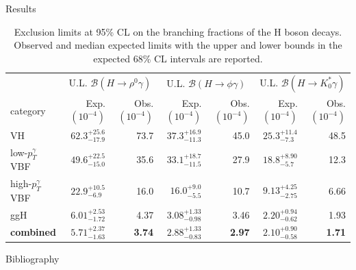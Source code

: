 \documentclass[9pt,aspectratio=1610]{beamer}
\begin{document}
\begin{frame}{Results}
	\begin{table}
		\centering
		\begin{tabular}{lrrrrrr}
			\hline
			& \multicolumn{2}{c}{U.L. $\mathcal{B}(H\rightarrow \rho^0\gamma)$}  & \multicolumn{2}{c}{U.L. $\mathcal{B}(H\rightarrow \phi\gamma)$} &  \multicolumn{2}{c}{U.L. $\mathcal{B}(H\rightarrow K^*_0\gamma)$}\\ [2ex]
			category & Exp.$(10^{-4})$ & Obs.$(10^{-4})$ & Exp.$(10^{-4})$ & Obs.$(10^{-4})$ & Exp.$(10^{-4})$ & Obs.$(10^{-4})$\\
			\hline
			VH & $62.3^{+25.6}_{-17.9}$ & 73.7 & $37.3^{+16.9}_{-11.3}$ & 45.0 & $25.3^{+11.4}_{-7.3}$ & 48.5 \\[2ex]
			low-$p_T^\gamma$ VBF & $49.6^{+22.5}_{-15.0}$ & 35.6 & $33.1^{+18.7}_{-11.5}$ & 27.9 & $18.8^{+8.90}_{-5.7}$  & 12.3\\[2ex]
			high-$p_T^\gamma$ VBF & $22.9^{+10.5}_{-6.9}$ & 16.0 & $16.0^{+9.0}_{-5.5}$ & 10.7 & $9.13^{+4.25}_{-2.75}$ & 6.66 \\[2ex]
			ggH &$6.01^{+2.53}_{-1.72}$ & 4.37 & $3.08^{+1.33}_{-0.98}$ & 3.46 & $2.20^{+0.94}_{-0.62}$ & 1.93\\ [2ex]
			\cellcolor{orange!50}\textbf{combined} & \cellcolor{orange!50}$5.71^{+2.37}_{-1.63}$ & \cellcolor{orange!50}\textbf{3.74} & \cellcolor{orange!50} $2.88^{+1.33}_{-0.83}$ & \cellcolor{orange!50} \textbf{2.97} & \cellcolor{orange!50}$2.10^{+0.90}_{-0.58}$ & \cellcolor{orange!50}\textbf{1.71} \\[2ex]
			\hline
		\end{tabular}
		\caption{Exclusion limits at 95\% CL on the branching fractions of the H boson decays. Observed and median expected limits with the upper and lower bounds in the expected 68\% CL intervals are reported.}
	\end{table}
\end{frame}


\begin{frame}{Bibliography}
	\scriptsize
	
	
\end{frame}
\end{document}

